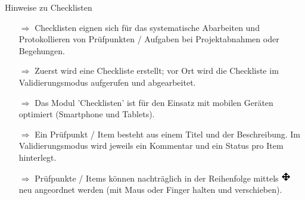 \documentclass{article}
\begin{document}
\begin{beamerlikethm}{Hinweise zu Checklisten}
\begin{itemize}
  \item[$\Longrightarrow$] Checklisten eignen sich für das systematische Abarbeiten und Protokollieren von Prüfpunkten / Aufgaben bei Projektabnahmen oder Begehungen.
  \item[$\Longrightarrow$] Zuerst wird eine Checkliste erstellt; vor Ort wird die Checkliste im Validierungsmodus aufgerufen und abgearbeitet.
  \item[$\Longrightarrow$] Das Modul 'Checklisten' ist für den Einsatz mit mobilen Geräten optimiert (Smartphone und Tablets).	
  \item[$\Longrightarrow$] Ein Prüfpunkt / Item besteht aus einem Titel und der Beschreibung. Im Validierungsmodus wird jeweils ein Kommentar und ein Status pro Item hinterlegt.
  \item[$\Longrightarrow$] Prüfpunkte / Items können nachträglich in der Reihenfolge mittels \includegraphics[height=12pt]{Icons/verschieben.png} neu angeordnet werden (mit Maus oder Finger halten und verschieben).	
\end{itemize}
\end{beamerlikethm}

\end{document}
